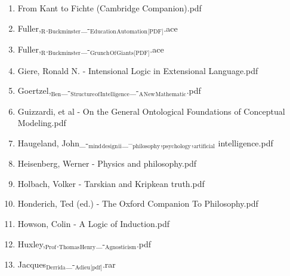 \documentclass[11pt]{article}
\begin{document}
\begin{enumerate}
\begin{enumerate}
\begin{enumerate}
\begin{enumerate}
\begin{enumerate}
\item From Kant to Fichte (Cambridge Companion).pdf
\label{sec-1-1-1-1-7-3-14-11}

\item Fuller,$_{\text{R}}$.$_{\text{Buckminster}}$\_-$_{\text{Education}}$$_{\text{Automation}}$$_{\text{[PDF]}}$.ace
\label{sec-1-1-1-1-7-3-14-12}

\item Fuller,$_{\text{R}}$.$_{\text{Buckminster}}$\_-$_{\text{Grunch}}$$_{\text{Of}}$$_{\text{Giants}}$$_{\text{[PDF]}}$.ace
\label{sec-1-1-1-1-7-3-14-13}

\item Giere, Ronald N. - Intensional Logic in Extensional Language.pdf
\label{sec-1-1-1-1-7-3-14-14}

\item Goertzel,$_{\text{Ben}}$\_-$_{\text{Structure}}$$_{\text{of}}$$_{\text{Intelligence}}$\_-$_{\text{A}}$$_{\text{New}}$$_{\text{Mathematic}}$.pdf
\label{sec-1-1-1-1-7-3-14-15}

\item Guizzardi, et al - On the General Ontological Foundations of Conceptual Modeling.pdf
\label{sec-1-1-1-1-7-3-14-16}

\item Haugeland, John\_-$_{\text{mind}}$$_{\text{design}}$$_{\text{ii}}$\_--$_{\text{philosophy}}$,$_{\text{psychology}}$,$_{\text{artificial}}$ intelligence.pdf
\label{sec-1-1-1-1-7-3-14-17}

\item Heisenberg, Werner - Physics and philosophy.pdf
\label{sec-1-1-1-1-7-3-14-18}

\item Holbach, Volker - Tarskian and Kripkean truth.pdf
\label{sec-1-1-1-1-7-3-14-19}

\item Honderich, Ted (ed.) - The Oxford Companion To Philosophy.pdf
\label{sec-1-1-1-1-7-3-14-20}

\item Howson, Colin - A Logic of Induction.pdf
\label{sec-1-1-1-1-7-3-14-21}

\item Huxley,$_{\text{Prof}}$.$_{\text{Thomas}}$$_{\text{Henry}}$\_-$_{\text{Agnosticism}}$.pdf
\label{sec-1-1-1-1-7-3-14-22}

\item Jacques$_{\text{Derrida}}$\_-$_{\text{Adieu}}$$_{\text{[pdf]}}$.rar
\label{sec-1-1-1-1-7-3-14-23}


\end{enumerate}
\end{enumerate}
\end{enumerate}
\end{enumerate}
\end{enumerate}
\end{document}
